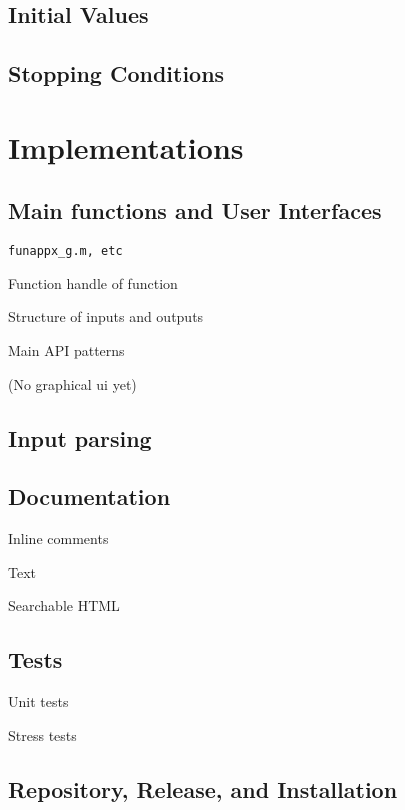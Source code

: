 \documentclass[acmtoms]{doc_acmtrans2m}
\begin{document}
\subsection{Initial Values}

\subsection{Stopping Conditions}

\section{Implementations} 
\label{sec:impl}


\subsection{Main functions and User Interfaces} \label{sec:ui}  
 
 \texttt{funappx\_g.m, etc}
 
 Function handle of function
 
 Structure of inputs and outputs
 
 Main API patterns
 
 (No graphical ui yet)
 
\subsection{Input parsing} 
  

\subsection{Documentation} \label{sec:doc}
  
  Inline comments
  
  Text
  
  Searchable HTML

\subsection{Tests} \label{sec:tests}  
 

Unit tests

Stress tests
 

\subsection{Repository, Release, and Installation} 
 
\end{document}
